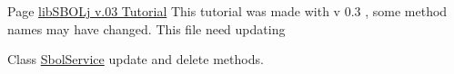 \label{todo__todo000002}
\hypertarget{todo__todo000002}{}
 
\begin{DoxyDescription}
\item[Page \hyperlink{tutorial}{libSBOLj v.03 Tutorial} ]This tutorial was made with v 0.3 , some method names may have changed. This file need updating
\end{DoxyDescription}

\label{todo__todo000001}
\hypertarget{todo__todo000001}{}
 
\begin{DoxyDescription}
\item[Class \hyperlink{classorg_1_1sbolstandard_1_1rdf_1_1_sbol_service}{SbolService} ]update and delete methods.
\end{DoxyDescription}
